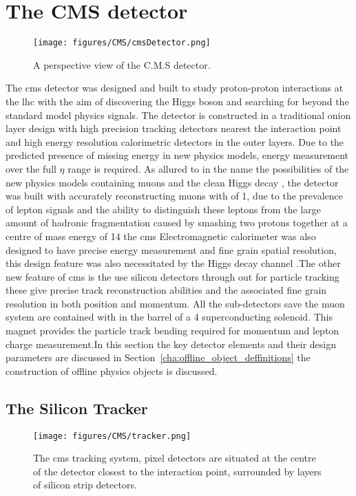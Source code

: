 \chapter{The CMS detector} %
\label{cha:the_cms_detector}
\begin{figure}[htbp]
  \centering
    \texttt{[image: figures/CMS/cmsDetector.png]}
  \caption{A perspective view of the C.M.S detector\cite{cms-sketchup}.}
  \label{fig:figures_CMS_cmsDetector}
\end{figure}

The \ac{cms} detector was designed and built to study proton-proton 
interactions at the \ac{lhc} with the aim of discovering the Higgs boson and 
searching for beyond the standard model physics signals. The detector is 
constructed in a traditional onion layer design with high precision tracking 
detectors nearest the interaction point and high energy resolution calorimetric 
detectors in the outer layers. Due to the predicted presence of missing energy \MET in new physics models, energy measurement over the full $\eta$ range is required. As allured to in the name the possibilities of the new physics models containing muons and the clean Higgs decay \HepProcess{\PH\to\PZ\PZ\to\Pmu\Pmu\Pmu\Pmu}, the detector was built with accurately reconstructing muons with \PT of \unit{1}{\TeV}, due to the prevalence of lepton signals and the ability to distinguish these leptons from the large amount of hadronic fragmentation caused by smashing two protons together at a centre of mass energy of \unit{14}{\TeV} the \ac{cms} Electromagnetic calorimeter was also designed to have precise energy measurement and fine grain spatial resolution, this design feature was also necessitated by the Higgs decay channel \HepProcess{\PH\to\Pphoton\Pphoton}.The other new feature of \ac{cms} is the use silicon detectors through out for particle tracking these give precise track reconstruction abilities and the associated fine grain resolution in both position and momentum. All the sub-detectors save the muon system are contained with in the barrel of a \unit{4}{\tesla} superconducting solenoid. This magnet provides the particle track bending required for momentum and lepton charge measurement.In this section the key detector elements and their design parameters are discussed in Section~\ref{cha:offline_object_deffinitions} the construction of offline physics objects is discussed.

\section{The Silicon Tracker} %
\label{sec:the_silicon_tracker}
\begin{figure}[htbp]
  \centering
    \texttt{[image: figures/CMS/tracker.png]}
  \caption{The \ac{cms} tracking system, pixel detectors are situated at the centre of the detector closest to the interaction point, surrounded by layers of silicon strip detectors\cite{cms-sketchup}.}
  \label{fig:figures_CMS_tracker}
\end{figure}

